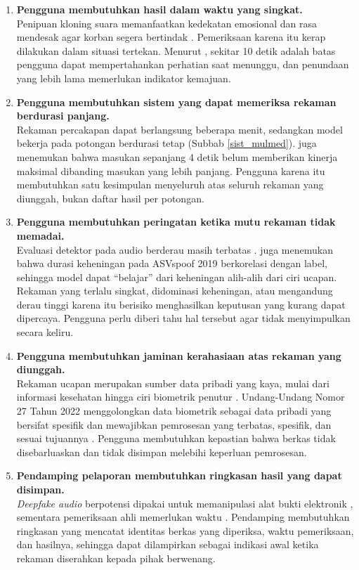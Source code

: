 \begin{enumerate}[{KP-}01.]
  \item \textbf{Pengguna membutuhkan hasil dalam waktu yang singkat.}\\
  Penipuan kloning suara memanfaatkan kedekatan emosional dan rasa mendesak agar korban segera bertindak \autocite{mcafee2023impostor}. Pemeriksaan karena itu kerap dilakukan dalam situasi tertekan. Menurut \textcite{nielsen1993response}, sekitar 10 detik adalah batas pengguna dapat mempertahankan perhatian saat menunggu, dan penundaan yang lebih lama memerlukan indikator kemajuan.

  \item \textbf{Pengguna membutuhkan sistem yang dapat memeriksa rekaman berdurasi panjang.}\\
  Rekaman percakapan dapat berlangsung beberapa menit, sedangkan model bekerja pada potongan berdurasi tetap (Subbab \ref{sist_mulmed}). \textcite{muller2022generalize} juga menemukan bahwa masukan sepanjang 4 detik belum memberikan kinerja maksimal dibanding masukan yang lebih panjang. Pengguna karena itu membutuhkan satu kesimpulan menyeluruh atas seluruh rekaman yang diunggah, bukan daftar hasil per potongan.

  \item \textbf{Pengguna membutuhkan peringatan ketika mutu rekaman tidak memadai.}\\
  Evaluasi detektor pada audio berderau masih terbatas \autocite{almutairi2022review}. \textcite{muller2021silence} juga menemukan bahwa durasi keheningan pada ASVspoof 2019 berkorelasi dengan label, sehingga model dapat ``belajar'' dari keheningan alih-alih dari ciri ucapan. Rekaman yang terlalu singkat, didominasi keheningan, atau mengandung derau tinggi karena itu berisiko menghasilkan keputusan yang kurang dapat dipercaya. Pengguna perlu diberi tahu hal tersebut agar tidak menyimpulkan secara keliru.

  \item \textbf{Pengguna membutuhkan jaminan kerahasiaan atas rekaman yang diunggah.}\\
  Rekaman ucapan merupakan sumber data pribadi yang kaya, mulai dari informasi kesehatan hingga ciri biometrik penutur \autocite{nautsch2019privacy}. Undang-Undang Nomor 27 Tahun 2022 menggolongkan data biometrik sebagai data pribadi yang bersifat spesifik dan mewajibkan pemrosesan yang terbatas, spesifik, dan sesuai tujuannya \autocite{uupdp2022}. Pengguna membutuhkan kepastian bahwa berkas tidak disebarluaskan dan tidak disimpan melebihi keperluan pemrosesan.

  \item \textbf{Pendamping pelaporan membutuhkan ringkasan hasil yang dapat disimpan.}\\
  \textit{Deepfake audio} berpotensi dipakai untuk memanipulasi alat bukti elektronik \autocite{Iman_2026}, sementara pemeriksaan ahli memerlukan waktu \autocite{SIP_Law_Firm_2025}. Pendamping membutuhkan ringkasan yang mencatat identitas berkas yang diperiksa, waktu pemeriksaan, dan hasilnya, sehingga dapat dilampirkan sebagai indikasi awal ketika rekaman diserahkan kepada pihak berwenang.
\end{enumerate}

